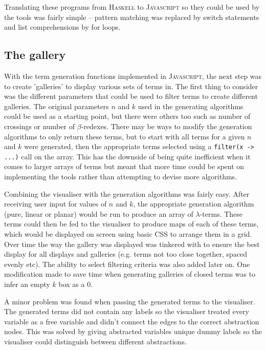 \documentclass[11pt]{article}
\begin{document}
Translating these programs from \textsc{Haskell} to \textsc{Javascript} so they could be used by the tools was fairly simple -- pattern matching was replaced by switch statements and list comprehensions by for loops.

\subsection{The gallery}
With the term generation functions implemented in \textsc{Javascript}, the next step was to create 'galleries' to display various sets of terms in. The first thing to consider was the different parameters that could be used to filter terms to create different galleries. The original parameters $n$ and $k$ used in the generating algorithms could be used as a starting point, but there were others too such as number of crossings or number of $\beta$-redexes. There may be ways to modify the generation algorithms to only return these terms, but to start with all terms for a given $n$ and $k$ were generated, then the appropriate terms selected using a \texttt{filter(x -> ...)} call on the array. This has the downside of being quite inefficient when it comes to larger arrays of terms but meant that more time could be spent on implementing the tools rather than attempting to devise more algorithms.

Combining the visualiser with the generation algorithms was fairly easy. After receiving user input for values of $n$ and $k$, the appropriate generation algorithm (pure, linear or planar) would be run to produce an array of $\lambda$-terms. These terms could then be fed to the visualiser to produce maps of each of these terms, which would be displayed on screen using basic CSS to arrange them in a grid. Over time the way the gallery was displayed was tinkered with to ensure the best display for all displays and galleries (e.g. terms not too close together, spaced evenly etc). The ability to select filtering criteria was also added later on. One modification made to save time when generating galleries of closed terms was to infer an empty $k$ box as a 0.

A minor problem was found when passing the generated terms to the visualiser. The generated terms did not contain any labels so the visualiser treated every variable as a free variable and didn't connect the edges to the correct abstraction nodes. This was solved by giving abstracted variables unique dummy labels so the visualiser could distinguish between different abstractions.
\end{document}
